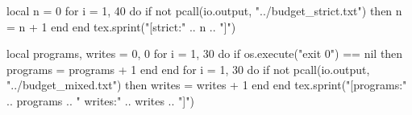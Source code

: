 \documentclass{article}
\begin{document}
\begin{luacode*}
local n = 0
for i = 1, 40 do if not pcall(io.output, "../budget_strict.txt") then n = n + 1 end end
tex.sprint("[strict:" .. n .. "]")
\end{luacode*}
\begin{luacode*}
local programs, writes = 0, 0
for i = 1, 30 do if os.execute("exit 0") == nil then programs = programs + 1 end end
for i = 1, 30 do if not pcall(io.output, "../budget_mixed.txt") then writes = writes + 1 end end
tex.sprint("[programs:" .. programs .. " writes:" .. writes .. "]")
\end{luacode*}
\end{document}
